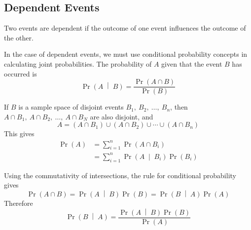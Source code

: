 \documentclass{article}
\begin{document}
\subsection{Dependent Events}
Two events are dependent if the outcome of one event influences the outcome of the other.
\begin{definition}
    In the case of dependent events, we must use \linebreak conditional probability concepts in calculating
    joint probabilities.
    The probability of \(A\) given that the event \(B\) has occurred is
    \begin{equation*}
        \Pr{\left( A \;\middle|\; B \right)} = \frac{\Pr{\left( A \cap B \right)}}{\Pr{\left( B \right)}}
    \end{equation*}
\end{definition}
\begin{theorem}
    If \(B\) is a sample space of disjoint events \(B_1,\: B_2,\: \dots,\: B_n\), then
    \(A \cap B_1,\: A \cap B_2,\: \dots,\: A \cap B_N\) are also disjoint, and
    \begin{equation*}
        A = \left( A \cap B_1 \right) \cup \left( A \cap B_2 \right) \cup \cdots \cup \left( A \cap B_n \right)
    \end{equation*}
    This gives
    \begin{align*}
        \Pr{\left( A \right)} & = \sum_{i=1}^n \Pr{\left( A \cap B_i \right)}                                 \\
                              & = \sum_{i=1}^n \Pr{\left( A \;\middle|\; B_i \right)} \Pr{\left( B_i \right)}
    \end{align*}
\end{theorem}
\begin{theorem}
    Using the commutativity of intersections, the rule for \linebreak conditional probability gives
    \begin{equation*}
        \Pr{\left( A \cap B \right)} = \Pr{\left( A \;\middle|\; B \right)} \Pr{\left( B \right)} = \Pr{\left( B \;\middle|\; A \right)} \Pr{\left( A \right)}
    \end{equation*}
    Therefore
    \begin{equation*}
        \Pr{\left( B \;\middle|\; A \right)} = \frac{\Pr{\left( A \;\middle|\; B \right)} \Pr{\left( B \right)}}{\Pr{\left( A \right)}}
    \end{equation*}
\end{theorem}
\end{document}
